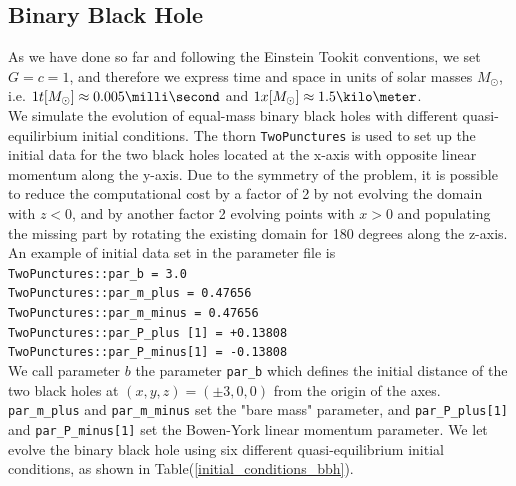 \subsection{Binary Black Hole}
As we have done so far and following the Einstein Tookit conventions, we set $G=c=1$, and therefore we express time and space in units of solar masses $M_{\odot}$, i.e. $1 t [M_{\odot}] \approx 0.005 \milli \second$ and $1 x [M_{\odot}] \approx 1.5 \kilo \meter$.\\
We simulate the evolution of equal-mass binary black holes with different quasi-equilirbium initial conditions.
The thorn \texttt{TwoPunctures} is used to set up the initial data for the two black holes located at the x-axis with opposite linear momentum along the y-axis.
Due to the symmetry of the problem, it is possible to reduce the computational cost by a factor of 2 by not evolving the domain with $z < 0$, and by another factor 2 evolving points with $x > 0$ and populating the missing part by rotating the existing domain for 180 degrees along the z-axis.
An example of initial data set in the parameter file is
\linebreak
\texttt{\\
TwoPunctures::par\_b             =  3.0 \\
TwoPunctures::par\_m\_plus        =  0.47656 \\
TwoPunctures::par\_m\_minus       =  0.47656 \\
TwoPunctures::par\_P\_plus [1]    = +0.13808 \\
TwoPunctures::par\_P\_minus[1]    = -0.13808
\\
}
\linebreak
We call parameter $b$ the parameter \texttt{par\_b} which defines the initial distance of the two black holes at $(x,y,z) = (\pm 3,0,0)$ from the origin of the axes. 
\texttt{par\_m\_plus} and \texttt{par\_m\_minus} set the "bare mass" parameter, and \texttt{par\_P\_plus[1]} and \texttt{par\_P\_minus[1]} set the Bowen-York linear momentum parameter.
We let evolve the binary black hole using six different quasi-equilibrium initial conditions, as shown in Table(\ref{initial_conditions_bbh}).
